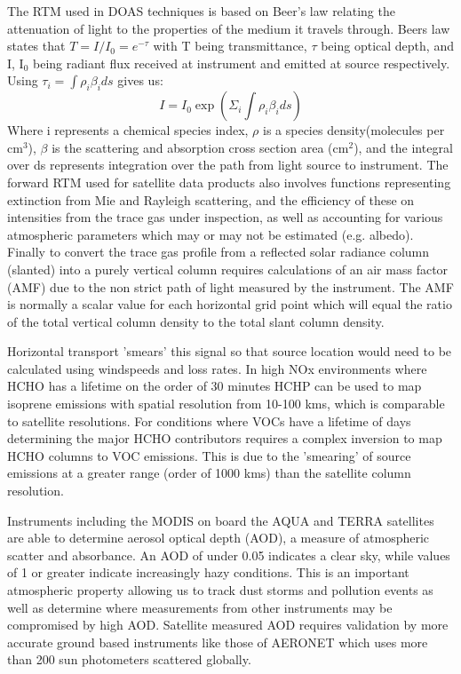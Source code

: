 The RTM used in DOAS techniques is based on Beer's law relating the attenuation of light to the properties of the medium it travels through.
Beers law states that $ T = I/I_0 = e^{-\tau} $ with T being transmittance, $\tau$ being optical depth, and I, I$_0$ being radiant flux received at instrument and emitted at source respectively.
Using 
$ \tau_i = \int \rho_i \beta_i ds $ gives us:
$$ I = I_0 \exp {\left( \Sigma_i \int \rho_i \beta_i ds \right) } $$
Where i represents a chemical species index, $\rho$ is a species density(molecules per cm$^3$), $\beta$ is the scattering and absorption cross section area (cm$^2$), and the integral over ds represents integration over the path from light source to instrument.
The forward RTM used for satellite data products also involves functions representing extinction from Mie and Rayleigh scattering, and the efficiency of these on intensities from the trace gas under inspection, as well as accounting for various atmospheric parameters which may or may not be estimated (e.g. albedo).
Finally to convert the trace gas profile from a reflected solar radiance column (slanted) into a purely vertical column requires calculations of an air mass factor (AMF) due to the non strict path of light measured by the instrument.
The AMF is normally a scalar value for each horizontal grid point which will equal the ratio of the total vertical column density to the total slant column density.

Horizontal transport 'smears' this signal so that source location would need to be calculated using windspeeds and loss rates.
In high NOx environments where HCHO has a lifetime on the order of 30 minutes HCHP can be used to map isoprene emissions with spatial resolution from 10-100 kms, which is comparable to satellite resolutions.
For conditions where VOCs have a lifetime of days determining the major HCHO contributors requires a complex inversion to map HCHO columns to VOC emissions.
This is due to the 'smearing' of source emissions at a greater range (order of 1000 kms) than the satellite column resolution.

Instruments including the MODIS on board the AQUA and TERRA satellites are able to determine aerosol optical depth (AOD), a measure of atmospheric scatter and absorbance. 
An AOD of under 0.05 indicates a clear sky, while values of 1 or greater indicate increasingly hazy conditions.
This is an important atmospheric property allowing us to track dust storms and pollution events as well as determine where measurements from other instruments may be compromised by high AOD.
Satellite measured AOD requires validation by more accurate ground based instruments like those of AERONET which uses more than 200 sun photometers scattered globally. 